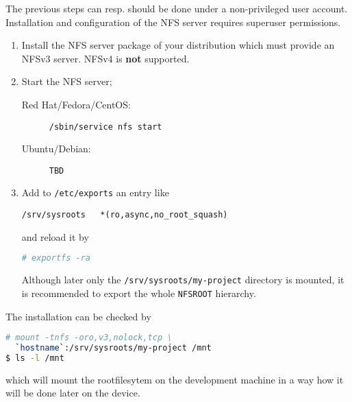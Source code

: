 The previous steps can resp. should be done under a non-privileged
user account.  Installation and configuration of the NFS server
requires superuser permissions.

\begin{enumerate}[resume]
\item Install the NFS server package of your distribution which must
  provide an NFSv3 server. NFSv4 is \textbf{not} supported.
\item Start the NFS server;

  \begin{description}
  \item[Red Hat/Fedora/CentOS:] \lstinline[language=sh]{/sbin/service nfs start}
  \item[Ubuntu/Debian:] \lstinline[language=sh]{TBD}
  \end{description}
\item Add to \texttt{/etc/exports} an entry like
\begin{verbatim}
/srv/sysroots   *(ro,async,no_root_squash)
\end{verbatim} and reload it by
\begin{lstlisting}[language=sh]
# exportfs -ra
\end{lstlisting}

  Although later only the \texttt{/srv/sysroots/my-project} directory
  is mounted, it is recommended to export the whole \texttt{NFSROOT}
  hierarchy.

\end{enumerate}

The installation can be checked by
\begin{lstlisting}[language=sh]
# mount -tnfs -oro,v3,nolock,tcp \
  `hostname`:/srv/sysroots/my-project /mnt
$ ls -l /mnt
\end{lstlisting}%
  which will mount the rootfilesytem on the development machine in a
  way how it will be done later on the device.

